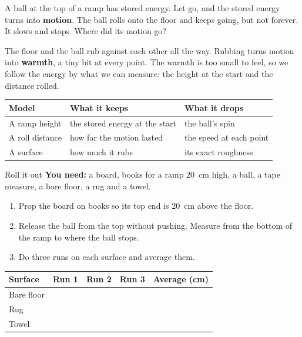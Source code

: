 \label{ch2}

A ball at the top of a ramp has stored energy. Let go, and the stored energy turns into \textbf{motion}. The ball rolls onto the floor and keeps going, but not forever. It slows and stops. Where did its motion go?

The floor and the ball rub against each other all the way. Rubbing turns motion into \textbf{warmth}, a tiny bit at every point. The warmth is too small to feel, so we follow the energy by what we can measure: the height at the start and the distance rolled.

\begin{center}
\sffamily\small\renewcommand{\arraystretch}{1.5}
\begin{tabular}{@{}p{3.4cm}p{3.7cm}p{3.7cm}@{}}
\toprule
\textbf{Model} & \textbf{What it keeps} & \textbf{What it drops}\\
\midrule
A ramp height & the stored energy at the start & the ball's spin\\
A roll distance & how far the motion lasted & the speed at each point\\
A surface & how much it rubs & its exact roughness\\
\bottomrule
\end{tabular}
\end{center}

\begin{tryit}{Roll it out}
\textbf{You need:} a board, books for a ramp 20~cm high, a ball, a tape measure, a bare floor, a rug and a towel.
\begin{enumerate}[leftmargin=1.6em]
\item Prop the board on books so its top end is 20~cm above the floor.
\item Release the ball from the top without pushing. Measure from the bottom of the ramp to where the ball stops.
\item Do three runs on each surface and average them.
\end{enumerate}
\par\medskip
\renewcommand{\arraystretch}{1.6}
\begin{tabular}{|l|c|c|c|c|}
\hline
\textbf{Surface} & \textbf{Run 1} & \textbf{Run 2} & \textbf{Run 3} & \textbf{Average (cm)}\\ \hline
Bare floor & & & & \\ \hline
Rug & & & & \\ \hline
Towel & & & & \\ \hline
\end{tabular}
\end{tryit}

